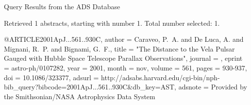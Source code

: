 Query Results from the ADS Database


Retrieved 1 abstracts, starting with number 1.  Total number selected: 1.

@ARTICLE{2001ApJ...561..930C,
   author = {{Caraveo}, P.~A. and {De Luca}, A. and {Mignani}, R.~P. and 
	{Bignami}, G.~F.},
    title = "{The Distance to the Vela Pulsar Gauged with Hubble Space Telescope Parallax Observations}",
  journal = {\apj},
   eprint = {astro-ph/0107282},
     year = 2001,
    month = nov,
   volume = 561,
    pages = {930-937},
      doi = {10.1086/323377},
   adsurl = {http://adsabs.harvard.edu/cgi-bin/nph-bib_query?bibcode=2001ApJ...561..930C&db_key=AST},
  adsnote = {Provided by the Smithsonian/NASA Astrophysics Data System}
}


